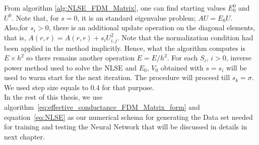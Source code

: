 From algorithm \eqref{alg:NLSE_FDM_Matrix}, one can find starting values $E_0^0$ and $U^0$. Note that, for $s = 0$, it is an standard eigenvalue problem; $AU = E_0U$. Also,for $s_i > 0$, there is an additional update operation on the diagonal elements, that is, $A(r,r) = A(r,r) + s_i U_{i,j}^2$. Note that the normalization condition had been applied in the method implicitly. Hence, what the algorithm computes is $E\times h^2$ so there remains another operation $E = E/h^2$. For each $S_i$, $i>0$, inverse power method used to solve the NLSE and $E_0$, $V_0$ obtained with $s=s_i$ will be used to warm start for the next iteration. The procedure will proceed till $s_k = \sigma$. We used step size equals to $0.4$ for that purpose.\\
In the rest of this thesis, we use algorithm~\eqref{eq:effective_conductance_FDM_Matrix_form} and equation~\eqref{eq:NLSE} as our numerical schema for generating the Data set needed for training and testing the Neural Network that will be discussed in details in next chapter.
